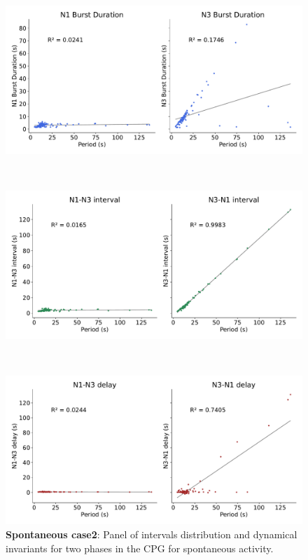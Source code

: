 \begin{figure}[htbp]
\begin{minipage}{0.9\textwidth}
\begin{minipage}[b]{0.53\textwidth}
			\centering
			\begin{minipage}[b]{\textwidth}
				\centering
				\includegraphics[width=\textwidth]{./invariants/data/SUSSEX/prep2/images/spontaneous_2phases_durations.pdf}
			\end{minipage}\\
			\begin{minipage}[b]{\textwidth}
				\centering
				\includegraphics[width=\textwidth]{./invariants/data/SUSSEX/prep2/images/spontaneous_2phases_intervals.pdf}
			\end{minipage}\\
			\begin{minipage}[b]{\textwidth}
				\centering
				\includegraphics[width=\textwidth]{./invariants/data/SUSSEX/prep2/images/spontaneous_2phases_delays.pdf}
			\end{minipage}
		\end{minipage}
	\end{minipage}
	\caption{\textbf{Spontaneous case2}: Panel of intervals distribution and dynamical invariants for two phases in the CPG for spontaneous activity.}
	\label{fig:prep2 2phase invariants}
\end{figure}

